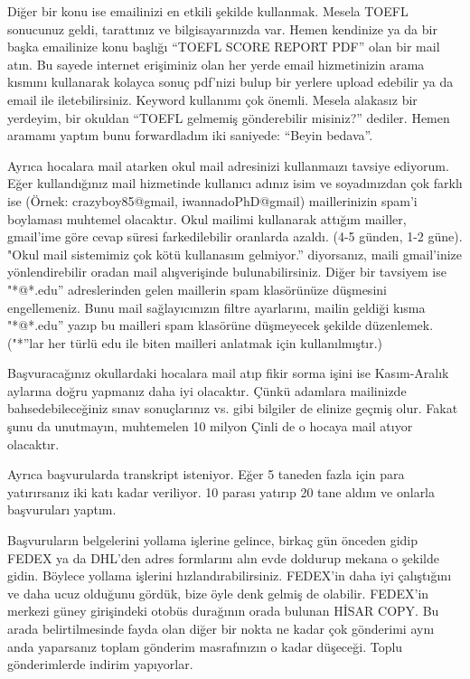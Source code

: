 \documentclass[12pt,a4paper]{article}
\begin{document}
Diğer bir konu ise emailinizi en etkili şekilde kullanmak. Mesela TOEFL sonucunuz geldi, tarattınız ve bilgisayarınızda var. Hemen kendinize ya da bir başka emailinize konu başlığı ``TOEFL SCORE REPORT PDF'' olan bir mail atın. Bu sayede internet erişiminiz olan her yerde email hizmetinizin arama kısmını kullanarak kolayca sonuç pdf'nizi bulup bir yerlere upload edebilir ya da email ile iletebilirsiniz. Keyword kullanımı çok önemli. Mesela alakasız bir yerdeyim, bir okuldan ``TOEFL gelmemiş gönderebilir misiniz?'' dediler. Hemen aramamı yaptım bunu forwardladım iki saniyede: ``Beyin bedava''. 

Ayrıca hocalara mail atarken okul mail adresinizi kullanmaızı tavsiye ediyorum. Eğer kullandığınız mail hizmetinde kullanıcı adınız isim ve soyadınızdan çok farklı ise (Örnek: crazyboy85@gmail, iwannadoPhD@gmail) maillerinizin spam'i boylaması muhtemel olacaktır. Okul mailimi kullanarak attığım mailler, gmail'ime göre cevap süresi farkedilebilir oranlarda azaldı. (4-5 günden, 1-2 güne). "Okul mail sistemimiz çok kötü kullanasım gelmiyor.'' diyorsanız, maili gmail'inize yönlendirebilir oradan mail alışverişinde bulunabilirsiniz. Diğer bir tavsiyem ise "*@*.edu'' adreslerinden gelen maillerin spam klasörünüze düşmesini engellemeniz. Bunu mail sağlayıcınızın filtre ayarlarını, mailin geldiği kısma "*@*.edu'' yazıp bu mailleri spam klasörüne düşmeyecek şekilde düzenlemek. ("*''lar her türlü edu ile biten mailleri anlatmak için kullanılmıştır.)

Başvuracağınız okullardaki hocalara mail atıp fikir sorma işini ise Kasım-Aralık aylarına doğru yapmanız daha iyi olacaktır. Çünkü adamlara mailinizde bahsedebileceğiniz sınav sonuçlarınız vs. gibi bilgiler de elinize geçmiş olur. Fakat şunu da unutmayın, muhtemelen 10 milyon Çinli de o hocaya mail atıyor olacaktır. 

Ayrıca başvurularda transkript isteniyor. Eğer 5 taneden fazla için para yatırırsanız iki katı kadar veriliyor. 10 parası yatırıp 20 tane aldım ve onlarla başvuruları yaptım.  

Başvuruların belgelerini yollama işlerine gelince, birkaç gün önceden gidip FEDEX ya da DHL'den adres formlarını alın evde doldurup mekana o şekilde gidin. Böylece yollama işlerini hızlandırabilirsiniz. FEDEX'in daha iyi çalıştığını ve daha ucuz olduğunu gördük, bize öyle denk gelmiş de olabilir. FEDEX’in merkezi güney girişindeki otobüs durağının orada bulunan HİSAR COPY. Bu arada belirtilmesinde fayda olan diğer bir nokta ne kadar çok gönderimi aynı anda yaparsanız toplam gönderim masrafınızın o kadar düşeceği. Toplu gönderimlerde indirim yapıyorlar. 
%
%
%
\newpage
\end{document}
